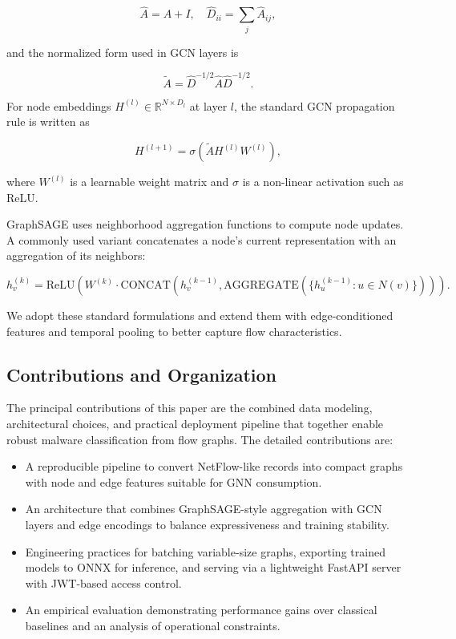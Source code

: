 \documentclass[conference]{IEEEtran}
\begin{document}
\begin{equation}
\hat{A} = A + I, \quad \hat{D}_{ii} = \sum_j \hat{A}_{ij},
\end{equation}

and the normalized form used in GCN layers is

\begin{equation}
\tilde{A} = \hat{D}^{-1/2} \hat{A} \hat{D}^{-1/2}.
\end{equation}

For node embeddings $H^{(l)} \in \mathbb{R}^{N \times D_l}$ at layer $l$, the standard GCN propagation rule is written as

\begin{equation}
H^{(l+1)} = \sigma\left( \tilde{A} H^{(l)} W^{(l)} \right),
\end{equation}

where $W^{(l)}$ is a learnable weight matrix and $\sigma$ is a non-linear activation such as ReLU.

GraphSAGE uses neighborhood aggregation functions  to compute node updates. A commonly used variant concatenates a node's current representation with an aggregation of its neighbors:

\begin{equation}
h_v^{(k)} = \text{ReLU}\left( W^{(k)} \cdot \text{CONCAT}\left(h_v^{(k-1)}, \text{AGGREGATE}\left( \{ h_u^{(k-1)} : u \in N(v) \} \right)\right) \right).
\end{equation}

We adopt these standard formulations and extend them with edge-conditioned features and temporal pooling to better capture flow characteristics.

\subsection{Contributions and Organization}

The principal contributions of this paper are the combined data modeling, architectural choices, and practical deployment pipeline that together enable robust malware classification from flow graphs. The detailed contributions are:

\begin{itemize}
  \item A reproducible pipeline to convert NetFlow-like records into compact graphs with node and edge features suitable for GNN consumption.
  \item An architecture that combines GraphSAGE-style aggregation with GCN layers and edge encodings to balance expressiveness and training stability.
  \item Engineering practices for batching variable-size graphs, exporting trained models to ONNX for inference, and serving via a lightweight FastAPI server with JWT-based access control.
  \item An empirical evaluation demonstrating performance gains over classical baselines and an analysis of operational constraints.
\end{itemize}
\end{document}
